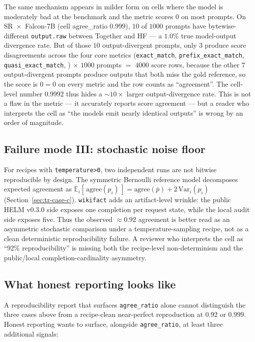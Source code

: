 \documentclass[11pt]{article}
\begin{document}
The same mechanism appears in milder form on cells where the model
  is moderately bad at the benchmark and the metric scores $0$ on
  most prompts.
On SR~$\times$~Falcon-7B (cell agree\_ratio $0.999$), $10$ of
  $1000$ prompts have bytewise-different \texttt{output.raw} between
  Together and HF --- a $1.0\%$ true model-output divergence rate.
But of those $10$ output-divergent prompts, only $3$ produce score
  disagreements across the four core metrics
  (\texttt{exact\_match}, \texttt{prefix\_exact\_match},
  \texttt{quasi\_exact\_match}, )
  $\times$ $1000$ prompts $=$ $4000$ score rows, because the other
  $7$ output-divergent prompts produce outputs that both miss the
  gold reference, so the score is $0=0$ on every metric and the row
  counts as ``agreement''.
The cell-level number $0.9992$ thus hides a $\sim 10\times$ larger
  output-divergence rate.
This is not a flaw in the metric --- it accurately reports score
  agreement --- but a reader who interprets the cell as ``the models
  emit nearly identical outputs'' is wrong by an order of magnitude.

\subsection{Failure mode III: stochastic noise floor}
\label{sec:tr-microavg-stochastic}

For recipes with \texttt{temperature>0}, two independent runs are not
  bitwise reproducible by design.
The symmetric Bernoulli reference model decomposes expected agreement as
  $\mathbb{E}_i[\,\text{agree}(p_i)\,] = \text{agree}(\bar p) + 2\,
  \mathrm{Var}_i(p_i)$
  (Section~\ref{sec:tr-case-c}).
\texttt{wikifact} adds an artifact-level wrinkle: the public HELM
  v0.3.0 side exposes one completion per request state, while the
  local audit side exposes five.
Thus the observed $\approx 0.92$ agreement is better read as an
  asymmetric stochastic comparison under a temperature-sampling recipe,
  not as a clean deterministic reproducibility failure.
A reviewer who interprets the cell as ``92\% reproducibility'' is
  missing both the recipe-level non-determinism and the public/local
  completion-cardinality asymmetry.
\subsection{What honest reporting looks like}
\label{sec:tr-microavg-honest}

A reproducibility report that surfaces \texttt{agree\_ratio} alone
  cannot distinguish the three cases above from a recipe-clean
  near-perfect reproduction at $0.92$ or $0.999$.
Honest reporting wants to surface, alongside \texttt{agree\_ratio},
  at least three additional signals:
\end{document}
